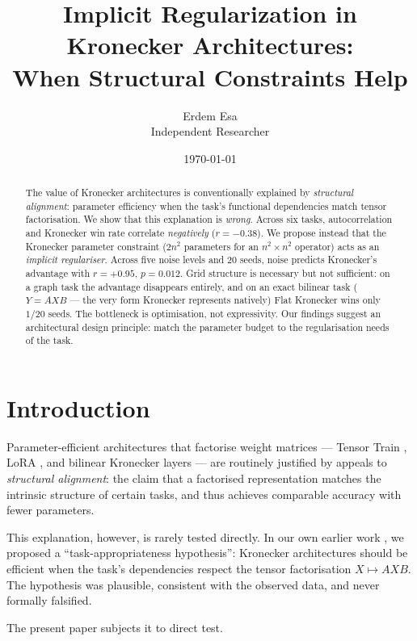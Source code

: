 \documentclass[11pt,a4paper]{article}
\title{Implicit Regularization in Kronecker Architectures:\\
When Structural Constraints Help}
\author{Erdem Esa\\ \small Independent Researcher}
\date{\today}
\begin{document}
\maketitle

\begin{abstract}
The value of Kronecker architectures is conventionally explained by
\emph{structural alignment}: parameter efficiency when the task's
functional dependencies match tensor factorisation. We show that this
explanation is \emph{wrong}. Across six tasks, autocorrelation and
Kronecker win rate correlate \emph{negatively} ($r = -0.38$). We
propose instead that the Kronecker parameter constraint
($2n^2$ parameters for an $n^2 \times n^2$ operator) acts as an
\emph{implicit regulariser}. Across five noise levels and 20 seeds,
noise predicts Kronecker's advantage with $r = +0.95$, $p = 0.012$.
Grid structure is necessary but not sufficient: on a graph task the
advantage disappears entirely, and on an exact bilinear task
($Y = AXB$ --- the very form Kronecker represents natively) Flat
Kronecker wins only $1/20$ seeds. The bottleneck is optimisation,
not expressivity. Our findings suggest an architectural design
principle: match the parameter budget to the regularisation needs
of the task.
\end{abstract}


\section{Introduction}
\label{sec:intro}

Parameter-efficient architectures that factorise weight matrices
--- Tensor Train \cite{novikov2015tensor}, LoRA \cite{hu2021lora},
and bilinear Kronecker layers \cite{tolstikhin2021mlp} --- are
routinely justified by appeals to \emph{structural alignment}: the
claim that a factorised representation matches the intrinsic
structure of certain tasks, and thus achieves comparable accuracy
with fewer parameters.

This explanation, however, is rarely tested directly. In our own
earlier work \cite{esa2026preprint2}, we proposed a
``task-appropriateness hypothesis'': Kronecker architectures
should be efficient when the task's dependencies respect the
tensor factorisation $X \mapsto AXB$. The hypothesis was plausible,
consistent with the observed data, and never formally falsified.

The present paper subjects it to direct test.
\end{document}
